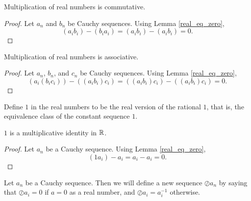 \documentclass[../../math.tex]{subfiles}
\begin{document}
\begin{instance}
    Multiplication of real numbers is commutative.
\end{instance}
\begin{proof}
    Let $a_n$ and $b_n$ be Cauchy sequences.  Using Lemma \ref{real_eq_zero},
    \[
        (a_i b_i) - (b_i a_i)
        = (a_i b_i) - (a_i b_i)
        = 0.
    \]
\end{proof}

\begin{instance}
    Multiplication of real numbers is associative.
\end{instance}
\begin{proof}
    Let $a_n$, $b_n$, and $c_n$ be Cauchy sequences.  Using Lemma
    \ref{real_eq_zero},
    \[
        (a_i (b_i c_i)) - ((a_i b_i) c_i)
        = ((a_i b_i) c_i) - ((a_i b_i) c_i)
        = 0.
    \]
\end{proof}

\begin{instance}
    Define $1$ in the real numbers to be the real version of the rational $1$,
    that is, the equivalence class of the constant sequence $1$.
\end{instance}

\begin{instance}
    $1$ is a multiplicative identity in $\mathbb{R}$.
\end{instance}
\begin{proof}
    Let $a_n$ be a Cauchy sequence.  Using Lemma \ref{real_eq_zero},
    \[
        (1 a_i) - a_i
        = a_i - a_i
        = 0.
    \]
\end{proof}

\begin{definition}
    Let $a_n$ be a Cauchy sequence.  Then we will define a new sequence $\oslash
    a_n$ by saying that $\oslash a_i = 0$ if $a = 0$ as a real number, and
    $\oslash a_i = a_i^{-1}$ otherwise.
\end{definition}
\end{document}
